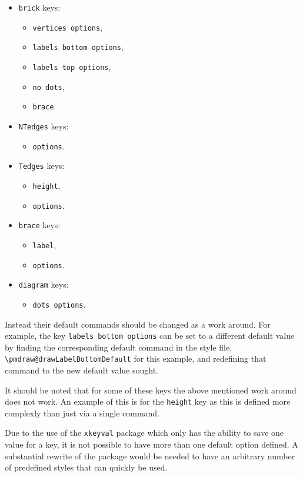 \documentclass{ltxdoc}
\begin{document}
\begin{itemize}
    \item \texttt{brick} keys:
    \begin{itemize}
        \item \texttt{vertices options},
        \item \texttt{labels bottom options},
        \item \texttt{labels top options},
        \item \texttt{no dots},
        \item \texttt{brace}.
    \end{itemize}
    \item \texttt{NTedges} keys:
    \begin{itemize}
        \item \texttt{options}.
    \end{itemize}
    \item \texttt{Tedges} keys:
    \begin{itemize}
        \item \texttt{height},
        \item \texttt{options}.
    \end{itemize}
    \item \texttt{brace} keys:
    \begin{itemize}
        \item \texttt{label},
        \item \texttt{options}.
    \end{itemize}
    \item \texttt{diagram} keys:
    \begin{itemize}
        \item \texttt{dots options}.
    \end{itemize}
\end{itemize}
Instead their default commands should be changed as a work around. For example, the key \texttt{labels bottom options} can be set to a different default value by finding the corresponding default command in the style file, \verb`\pmdraw@drawLabelBottomDefault` for this example, and redefining that command to the new default value sought.

It should be noted that for some of these keys the above mentioned work around does not work. An example of this is for the \texttt{height} key as this is defined more complexly than just via a single command.

Due to the use of the \texttt{xkeyval} package which only has the ability to save one value for a key, it is not possible to have more than one default option defined. A substantial rewrite of the package would be needed to have an arbitrary number of predefined styles that can quickly be used.
\end{document}
